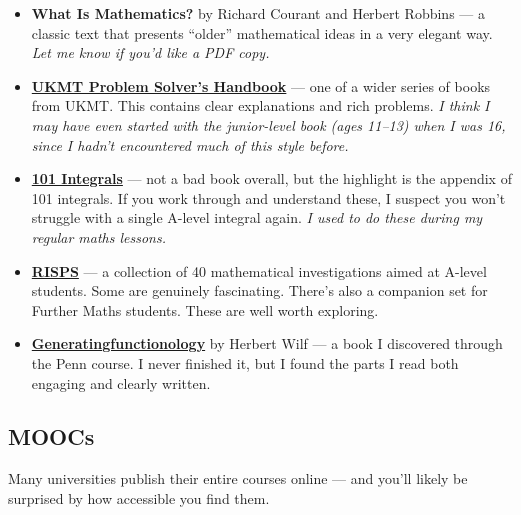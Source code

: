 \documentclass[11pt]{article}
\newif\ifshowpersonal
\newcommand{\personal}[1]{\ifshowpersonal\textcolor{myorange}{\emph{#1}}\fi}
\begin{document}
\begin{itemize}
\item \textbf{What Is Mathematics?} by Richard Courant and Herbert Robbins — a classic text that presents “older” mathematical ideas in a very elegant way. \emph{Let me know if you’d like a PDF copy.}

\item \href{https://ukmt.org.uk/product/a-problem-solvers-handbook}{\textbf{UKMT Problem Solver’s Handbook}} — one of a wider series of books from UKMT. This contains clear explanations and rich problems. \emph{I think I may have even started with the junior-level book (ages 11–13) when I was 16, since I hadn’t encountered much of this style before.}

\item \href{https://isaacphysics.org/books/pre_uni_maths_2e}{\textbf{101 Integrals}} — not a bad book overall, but the highlight is the appendix of 101 integrals. If you work through and understand these, I suspect you won’t struggle with a single A-level integral again. \emph{I used to do these during my regular maths lessons.}
  
\item \href{https://www.risps.co.uk/}{\textbf{RISPS}} — a collection of 40 mathematical investigations aimed at A-level students. Some are genuinely fascinating. There's also a companion set for Further Maths students. These are well worth exploring.
  

\item \href{https://www2.math.upenn.edu/~wilf/gfologyLinked2.pdf}{\textbf{Generatingfunctionology}} by Herbert Wilf — a book I discovered through the Penn course. I never finished it, but I found the parts I read both engaging and clearly written.
\end{itemize}

\subsection{MOOCs}

Many universities publish their entire courses online --- and you'll likely be surprised by how accessible you find them.

\personal{Over the summers of Year 11 and Year 12 (and into Year 13), I worked through the following three. I completed most of the material, and this gave me a real head start at university — I felt much more comfortable with many concepts than my peers.}
\end{document}
